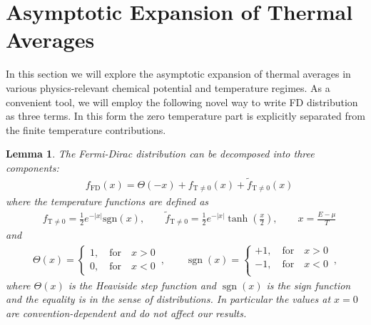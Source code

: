 \documentclass[sn-mathphys,Numbered]{sn-jnl}
\DeclareMathOperator{\sgn}{sgn}
\newtheorem{lemma}[theorem]{Lemma}
\begin{document}
\section{Asymptotic Expansion of Thermal Averages }\label{sec:Sommerfeld}
In this section we will explore the asymptotic expansion of thermal averages in various  physics-relevant  chemical potential and temperature regimes.   As a convenient tool, we will employ the following novel way to write FD distribution as three terms. In this form the zero temperature part is explicitly separated from the finite temperature contributions. 
\begin{lemma}
    The Fermi-Dirac distribution can be decomposed into three components:
\begin{align}\label{Eq_form}
&f_\mathrm{FD}(x)=\Theta(-x)+f_\mathrm{T\neq0}(x)+\widetilde f_\mathrm{T\neq0}(x)
\end{align}
where the temperature functions are defined as
\begin{align}\label{eq:f_T_nonzero_def}
&f_\mathrm{T\neq0}=\frac{1}{2}e^{ -|x| }\mathrm{sgn}\left(x\right),\qquad
\widetilde f_\mathrm{T\neq0}=\frac{1}{2}e^{ - |x| }\tanh\left(\frac{x}{2}\right),\qquad x=\frac{E-\mu}{T}
\end{align}
and
\begin{align}
\label{NFF2}
\Theta(x)=\left\{
\begin{array}{r}
1,\quad\mathrm{for}\quad{x}>0\\
0,\quad\mathrm{for}\quad{x}<0
\end{array}\right.\,,\qquad
\sgn(x)=\left\{
\begin{array}{r}
+1,\quad\mathrm{for}\quad{x}>0\\
-1,\quad\mathrm{for}\quad{x}<0\\
\end{array}\right.\,,
\end{align}
where $\Theta(x)$ is the Heaviside step function and $\sgn(x)$ is the sign function and the equality is in the sense of distributions. In particular the values at $x=0$ are convention-dependent and do not affect our results. 
\end{lemma}
\end{document}
